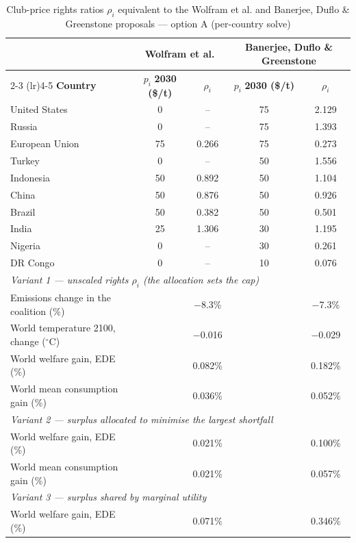 \begin{table}[htbp]
\centering
\small
\caption{Club-price rights ratios $\rho_i$ equivalent to the Wolfram et al. and Banerjee, Duflo \& Greenstone proposals --- option A (per-country solve)}
\renewcommand{\arraystretch}{1.15}
\begin{tabular}{lcccc}
  \toprule
  & \multicolumn{2}{c}{\textbf{Wolfram et al.}} & \multicolumn{2}{c}{\textbf{Banerjee, Duflo \& Greenstone}} \\
  \cmidrule(lr){2-3} \cmidrule(lr){4-5}
  \textbf{Country} & $p_i$ \textbf{2030 (\$/t)} & $\rho_i$ & $p_i$ \textbf{2030 (\$/t)} & $\rho_i$ \\
  \midrule
  United States & 0 & -- & 75 & 2.129 \\
  Russia & 0 & -- & 75 & 1.393 \\
  European Union & 75 & 0.266 & 75 & 0.273 \\
  Turkey & 0 & -- & 50 & 1.556 \\
  Indonesia & 50 & 0.892 & 50 & 1.104 \\
  China & 50 & 0.876 & 50 & 0.926 \\
  Brazil & 50 & 0.382 & 50 & 0.501 \\
  India & 25 & 1.306 & 30 & 1.195 \\
  Nigeria & 0 & -- & 30 & 0.261 \\
  DR Congo & 0 & -- & 10 & 0.076 \\
  \midrule
  \multicolumn{5}{l}{\textit{Variant 1 --- unscaled rights $\rho_i$ (the allocation sets the cap)}} \\
  \quad Emissions change in the coalition (\%) &  & $-$8.3\% &  & $-$7.3\% \\
  \quad World temperature 2100, change ($^\circ$C) &  & $-$0.016 &  & $-$0.029 \\
  \quad World welfare gain, EDE (\%) &  & 0.082\% &  & 0.182\% \\
  \quad World mean consumption gain (\%) &  & 0.036\% &  & 0.052\% \\
  \midrule
  \multicolumn{5}{l}{\textit{Variant 2 --- surplus allocated to minimise the largest shortfall}} \\
  \quad World welfare gain, EDE (\%) &  & 0.021\% &  & 0.100\% \\
  \quad World mean consumption gain (\%) &  & 0.021\% &  & 0.057\% \\
  \midrule
  \multicolumn{5}{l}{\textit{Variant 3 --- surplus shared by marginal utility}} \\
  \quad World welfare gain, EDE (\%) &  & 0.071\% &  & 0.346\% \\

\end{tabular}
\end{table}
